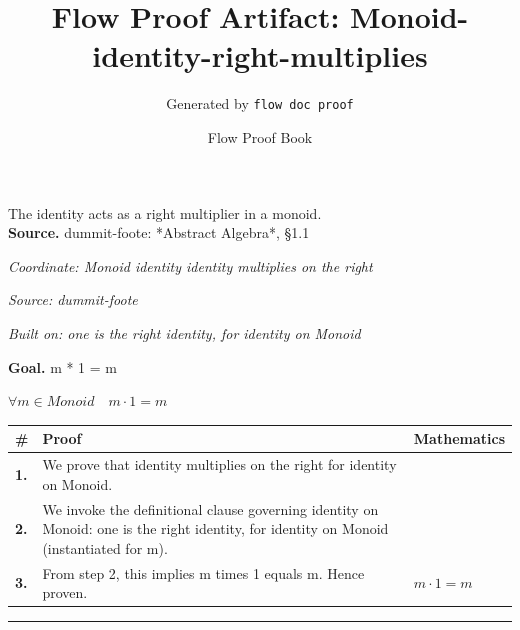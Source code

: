 \documentclass[11pt]{article}
\title{Flow Proof Artifact: Monoid-identity-right-multiplies}
\author{Generated by \texttt{flow doc proof}}
\date{Flow Proof Book}
\theoremstyle{definition}
\begin{document}
\maketitle
The identity acts as a right multiplier in a monoid.\\[0.5em]
\textbf{Source.} dummit-foote: *Abstract Algebra*, §1.1\\[0.5em]
\bigskip
{}\par
\smallskip\noindent\textit{Coordinate: Monoid \cdot identity \cdot identity multiplies on the right}\par
\smallskip\noindent\textit{Source: dummit-foote}\par
\smallskip\noindent\textit{Built on: one is the right identity, for identity on Monoid}\par
\medskip
\noindent\textbf{Goal.} m * 1 = m\par
\noindent$\displaystyle \forall m \in Monoid\quad m \cdot 1 = m$\par
\medskip
\noindent
\begin{tabular}{@{} >{\raggedright\arraybackslash}p{} >{\raggedright\arraybackslash}p{} >{\raggedleft\arraybackslash}p{} @{}}
\textbf{\#} & \textbf{Proof} & \textbf{Mathematics} \\
\midrule
\textbf{1.} & We prove that identity multiplies on the right for identity on Monoid. & \\[0.45em]
\textbf{2.} & We invoke the definitional clause governing identity on Monoid: one is the right identity, for identity on Monoid (instantiated for m). & \\[0.45em]
\textbf{3.} & From step 2, this implies m times 1 equals m. Hence proven. & $\displaystyle m \cdot 1 = m$ \\[0.45em]
\bottomrule
\end{tabular}
\label{thm:Monoid-identity-identity_multiplies_on_the_right}
\par\medskip\hrule
\end{document}
